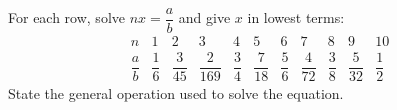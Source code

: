 For each row, solve $nx=\dfrac{a}{b}$ and give $x$ in lowest terms:
\[
\begin{array}{c|cccccccccc}
n&1&2&3&4&5&6&7&8&9&10\\ \hline
\dfrac{a}{b}&\dfrac{1}{6}&\dfrac{3}{45}&\dfrac{2}{169}&\dfrac{3}{4}&\dfrac{7}{18}&\dfrac{5}{6}&\dfrac{4}{72}&\dfrac{3}{8}&\dfrac{5}{32}&\dfrac{1}{2}
\end{array}
\]
State the general operation used to solve the equation.
